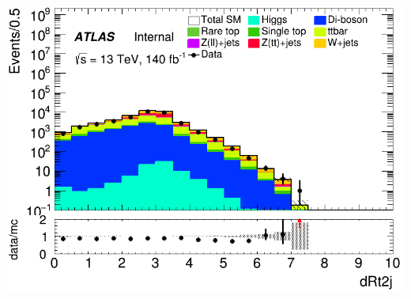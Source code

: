 \documentclass[usenames,dvipsnames]{beamer}
\begin{document}
\begin{frame}
\begin{minipage}{0.32\textwidth}
        \centering
        \includegraphics[width=\textwidth]{graphics/L_met/L_met_dRt2j.png}
    \end{minipage}
    
    \vspace{0.5cm} %


\end{frame}
\end{document}
